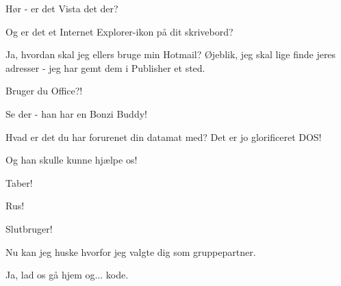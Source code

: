\documentclass[a4paper,11pt]{article}
\begin{document}
\begin{sketch}

   Hør - er det Vista det der?

   Og er det et Internet Explorer-ikon på dit skrivebord?

   Ja, hvordan skal jeg ellers bruge min Hotmail?  Øjeblik, jeg skal
  lige finde jeres adresser - jeg har gemt dem i Publisher et sted.

   Bruger du Office?!

   Se der - han har en Bonzi Buddy!

   Hvad er det du har forurenet din datamat med? Det er jo glorificeret DOS!

   Og han skulle kunne hjælpe os!

   Taber!

   Rus!

   Slutbruger!



   Nu kan jeg huske hvorfor jeg valgte dig som gruppepartner.

   Ja, lad os gå hjem og... kode.
\end{sketch}
\end{document}
